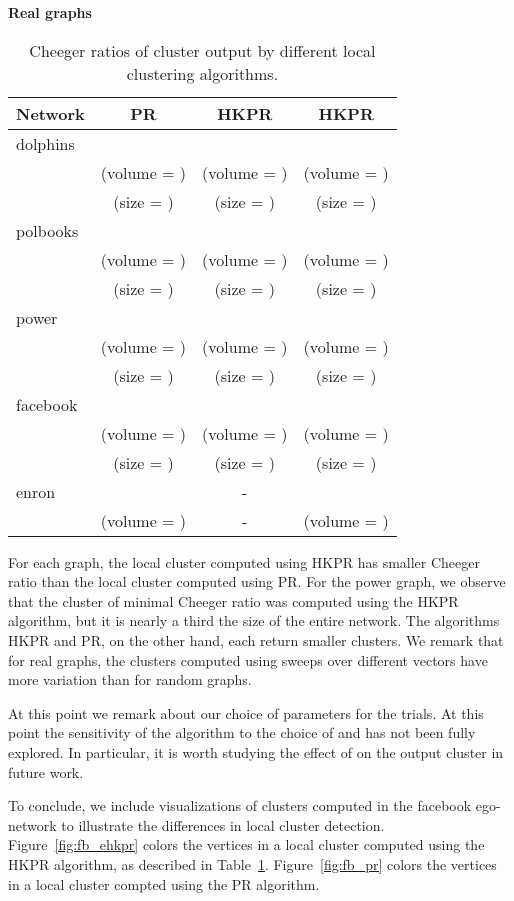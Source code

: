 \documentclass[runningheads,a4paper]{llncs}
\begin{document}
\begin{table}
\centering
\textbf{Real graphs}\\
\begin{tabular}{|p{2cm}|c|c|c|}
\hline
\multicolumn{1}{|c|}{Network} & PR & HKPR & HKPR\\
\hline\hline
dolphins &  &  &  \\
         & (volume = ) & (volume = ) & (volume = )\\
         & (size = ) & (size = ) & (size = )\\\hline
polbooks &  &  & \\
         & (volume = ) & (volume = ) & (volume = )\\
         & (size = ) & (size = ) & (size = )\\\hline
power    &     &  &  \\
         & (volume = ) & (volume = ) & (volume = )\\
         & (size = ) & (size = ) & (size = )\\\hline
facebook &  &  &  \\
         & (volume = ) & (volume = ) & (volume = )\\
         & (size = ) & (size = ) & (size = )\\\hline
enron    &  & - & \\
         & (volume = ) & - &  (volume = )\\
\hline 
\end{tabular}
\caption{Cheeger ratios of cluster output by different local clustering
algorithms.}
\label{table:cheegerreal}
\end{table}

For each graph, the local cluster computed using HKPR has smaller
Cheeger ratio than the local cluster computed using PR.  For the power graph, we
observe that the cluster of minimal Cheeger ratio was computed using the HKPR
algorithm, but it is nearly a third the size of the entire network.  The
algorithms HKPR and PR, on the other hand, each return smaller
clusters.  We remark that for real graphs, the clusters computed using sweeps
over different vectors have more variation than for random graphs.

At this point we remark about our choice of parameters for the trials.  At this
point the sensitivity of the algorithm to the choice of  and
 has not been fully explored.  In particular, it is worth studying
the effect of  on the output cluster in future work.


To conclude, we include visualizations of clusters computed in the facebook
ego-network to illustrate the differences in local cluster detection.
Figure~\ref{fig:fb_ehkpr} colors the vertices in a local cluster computed using
the HKPR algorithm, as described in Table~\ref{table:cheegerreal}.
Figure~\ref{fig:fb_pr} colors the vertices in a local cluster compted using the
PR algorithm.
\end{document}

